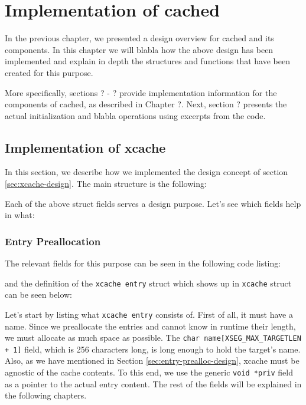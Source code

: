 \chapter{Implementation of cached}\label{ch:cached-implementation}

In the previous chapter, we presented a design overview for cached and its 
components. In this chapter we will blabla how the above design has been
implemented and explain in depth the structures and functions that have been 
created for this purpose.

More specifically, sections ? - ? provide implementation information for the 
components of cached, as described in Chapter ?. Next, section ? presents the 
actual initialization and blabla operations using excerpts from the code.

\section{Implementation of xcache}

In this section, we describe how we implemented the design concept of section 
\ref{sec:xcache-design}. The main \xcache structure is the following:


Each of the above \xcache struct fields serves a design purpose.
Let's see which fields help in what:

\subsection{Entry Preallocation}

The relevant fields for this purpose can be seen in the following code listing:


and the definition of the \texttt{xcache entry} struct which shows up in 
\texttt{xcache} struct can be seen below:


Let's start by listing what \texttt{xcache entry} consists of. First of all, it 
must have a name. Since we preallocate the entries and cannot know in runtime 
their length, we must allocate as much space as possible. The \texttt{char 
	name[XSEG\_MAX\_TARGETLEN + 1]} field, which is 256 characters long, is 
long enough to hold the target's name. Also, as we have mentioned in Section 
\ref{sec:entry-prealloc-design}, xcache must be agnostic of the cache contents.  
To this end, we use the generic \texttt{void *priv} field as a pointer to the 
actual entry content. The rest of the fields will be explained in the following 
chapters.

